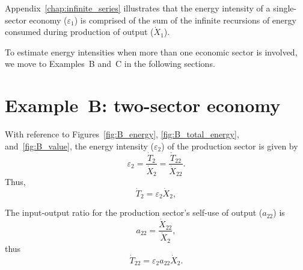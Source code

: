 Appendix~\ref{chap:infinite_series} illustrates that the energy 
intensity of a single-sector economy ($\varepsilon_{1}$) 
is comprised of the sum of the infinite recursions
of energy consumed during production of output ($\dot{X}_{1}$).

To estimate energy intensities
when more than one economic sector is involved, 
we move to Examples~B and~C in the following sections.


\section{Example~B: two-sector economy} %

With reference to Figures~\ref{fig:B_energy}, 
\ref{fig:B_total_energy},
and~\ref{fig:B_value}, 
the energy intensity ($\varepsilon_{2}$) 
of the production sector is given by
%
\begin{equation} \label{eq:single_sector_energy_intensity}
	\varepsilon_{2} 
	= \frac{\dot{T}_{2}}{\dot{X}_{2}} 
	= \frac{\dot{T}_{22}}{\dot{X}_{22}}.
\end{equation}
%
Thus,
%
\begin{equation} \label{eq:T_dot_1_single_sector}
	\dot{T}_{2} = \varepsilon_{2}\dot{X}_{2},
\end{equation}

The input-output ratio 
for the production sector's self-use of output ($a_{22}$) is
%
\begin{equation} \label{eq:io_ratio_single_sector}
	a_{22} = \frac{\dot{X}_{22}}{\dot{X}_{2}},
\end{equation}
%
thus
%
\begin{equation} \label{eq:T_dot_11_single_sector}
	\dot{T}_{22} = \varepsilon_{2}a_{22}\dot{X}_{2}.
\end{equation}

